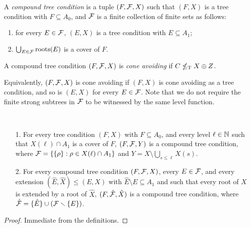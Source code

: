 \begin{definition}
A \emph{compound tree condition} is a tuple $(F, \mathcal{F}, X)$ such that $(F, X)$ is a tree condition with $F \subseteq A_0$, and $\mathcal{F}$ is a finite collection of finite sets as follows:
\begin{enumerate}
	\item for every $E \in \mathcal{F}$, $(E, X)$ is a tree condition with $E \subseteq A_1$;
	\item $\bigcup_{E \in \mathcal{F}} \operatorname{roots}(E)$ is a cover of $F$.
\end{enumerate}
A compound tree condition $(F, \mathcal{F}, X)$ is \emph{cone avoiding} if $C \nleq_{\text{\upshape T}} X \oplus Z$.
\end{definition}

\noindent Equivalently, $(F, \mathcal{F}, X)$ is cone avoiding if $(F, X)$ is cone avoiding as a tree condition, and so is $(E, X)$ for every $E \in \mathcal{F}$. Note that we do not require the finite strong subtrees in $\mathcal{F}$ to be witnessed by the same level function.

\begin{lemma}\label{lem:mtt1-sca-compound-creator}\
\begin{itemize}
	\item[1.] For every tree condition $(F, X)$ with $F \subseteq A_0$, and every level $\ell \in \mathbb{N}$ such that $X(\ell) \cap A_1$ is a cover of $F$, $(F, \mathcal{F}, Y)$ is a compound tree condition, where $\mathcal{F} = \{ \{ \rho \}: \rho \in X(\ell) \cap A_1 \}$ and $Y = X \setminus \bigcup_{s \leq \ell} X(s)$.
	\item[2.] For every compound tree condition $(F, \mathcal{F}, X)$, every  $E \in \mathcal{F}$, and every extension $(\hat{E}, \hat{X}) \leq (E, X)$ with
	$\hat{E} \setminus E \subseteq A_1$ and such that every root of $X$ is extended by a root of $\hat{X}$, $(F, \hat{\mathcal{F}}, \hat{X})$ is a compound tree condition, where $\hat{\mathcal{F}} = \{\hat{E}\} \cup (\mathcal{F} \smallsetminus \{E\})$.
\end{itemize}
\end{lemma}

\begin{proof}
	Immediate from the definitions.	
\end{proof}


